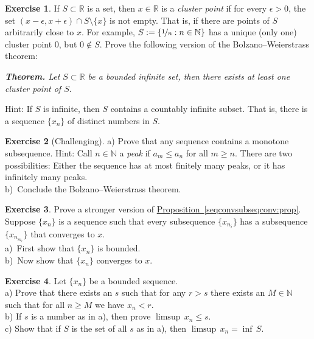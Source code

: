 \documentclass[12pt]{book}
\newcommand{\R}{{\mathbb{R}}}
\newcommand{\N}{{\mathbb{N}}}
\newcommand{\myindex}[1]{#1\index{#1}}
\theoremstyle{plain}
\theoremstyle{remark}
\theoremstyle{definition}
\theoremstyle{exercise}
\newtheorem{exercise}{Exercise}[section]
\theoremstyle{example}
\newcommand{\propref}[1]{\hyperref[#1]{Proposition~\ref*{#1}}}
\begin{document}
\begin{exercise}
If $S \subset \R$ is a set, then $x \in \R$ is a \emph{\myindex{cluster
point}}
if for every $\epsilon > 0$, the set $(x-\epsilon,x+\epsilon) \cap S
\setminus \{ x \}$ is not empty.  That is, if there are points of $S$
arbitrarily close to $x$.
For example, $S := \{ \nicefrac{1}{n} : n \in \N \}$ has a unique (only
one) cluster point $0$, but $0 \notin S$.
Prove the following version of the Bolzano--Weierstrass theorem:

\medskip

\noindent
\emph{\textbf{Theorem.} Let $S \subset \R$ be a bounded infinite set,
then there exists at least one cluster point of $S$}.

\medskip

Hint: If $S$ is infinite, then $S$ contains a countably infinite subset.
That is, there is a sequence $\{ x_n \}$ of distinct numbers in $S$.
\end{exercise}

\begin{exercise}[Challenging]
a)
Prove that any sequence contains a monotone subsequence.
Hint: Call $n \in \N$ a \emph{peak} if $a_m \leq a_n$ for all $m \geq n$.  
There are two possibilities: Either the sequence has at most finitely many
peaks,
or it has infinitely many peaks.
\\ \nopagebreak
b)~Conclude the Bolzano--Weierstrass theorem.
\end{exercise}

\begin{exercise}
Prove a stronger version of \propref{seqconvsubseqconv:prop}.
Suppose $\{ x_n \}$ is a sequence such that every subsequence $\{
x_{n_i} \}$ has a subsequence
$\{ x_{n_{m_i}} \}$ that converges to $x$.\\
a)~First show that $\{ x_n \}$ is
bounded.\\
b)~Now show that $\{ x_n \}$ converges to $x$.
\end{exercise}

\begin{exercise}
Let $\{x_n\}$ be a bounded sequence.
\\
a) Prove that there exists an $s$ such that for any $r > s$ there exists 
an $M \in \N$ such that for all $n \geq M$ we have
$x_n < r$.
\\
b) If $s$ is a number as in a), then prove $\limsup \, x_n \leq s$.
\\
c) Show that if $S$ is the set of all $s$ as in a), then
$\limsup \, x_n = \inf \, S$.
\end{exercise}
\end{document}
